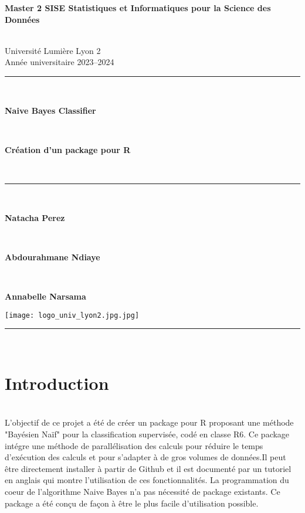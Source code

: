 \documentclass[]{article}
\begin{document}
\thispagestyle{empty}

\begin{center}
    

       {\LARGE\textbf{Master 2 SISE Statistiques et Informatiques pour la Science des Données} \par} \\
       \vspace{0.8cm}
       \normalsize Université Lumière Lyon 2 \\
       \normalsize Année universitaire 2023–2024 \\
        \vspace{1cm}
        \textcolor{black}{\rule{17cm}{0.1cm}}\\[8mm]
       {\LARGE\textbf{Naive Bayes Classifier} \par} \\
        \vspace{0.7cm}
       {\LARGE\textbf{Création d'un package pour R} \par} \\
       \vspace{1cm}
      \textcolor{black}{\rule{17cm}{0.1cm}}\\[8mm]
        \begin{center}
        \vspace{1cm}
        {\LARGE\textbf{Natacha Perez} \par} \\
        {\LARGE\textbf{Abdourahmane Ndiaye} \par} \\
        {\LARGE\textbf{Annabelle Narsama} \par} 
        \end{center}
\end{center}
\vspace{0.1cm}
\begin{center}
    \texttt{[image: logo\_univ\_lyon2.jpg.jpg]}
\end{center}

\newpage

\rule{0.001pt}{0.001pt}\\ 
\tableofcontents
\newpage
\section{Introduction}
\vspace{0.2\baselineskip}\\
L'objectif de ce projet a été de créer un package pour R proposant une méthode "Bayésien Naïf" pour la classification supervisée, codé en classe R6. Ce package intégre une méthode de  parallélisation des calculs pour réduire le temps d'exécution des calculs et pour s'adapter à de gros volumes de données.Il peut être directement installer à partir de Github et il est documenté par un tutoriel en anglais qui montre l'utilisation de ces fonctionnalités. La programmation du coeur de l'algorithme Naive Bayes n'a pas nécessité de package existants. Ce package a été conçu de façon à être le plus facile d'utilisation possible.  
\vspace{0.2\baselineskip}
\end{document}
